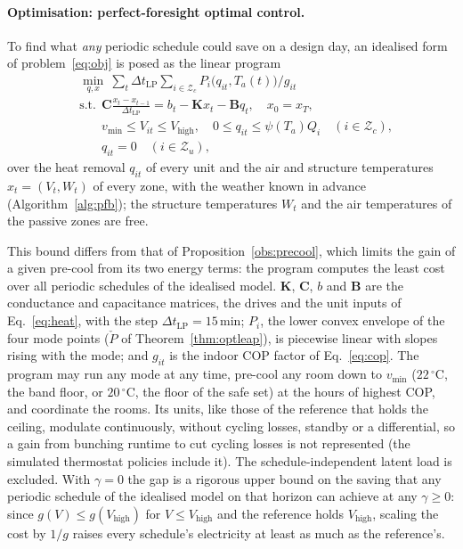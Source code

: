 \documentclass[10pt,a4paper,twocolumn]{article}
\theoremstyle{definition}
\begin{document}
\paragraph{Optimisation: perfect-foresight optimal control.}\label{sec:lpbench}\label{sec:optjust} To find what \emph{any} periodic schedule could save on a design day, an idealised form of problem~\eqref{eq:obj} is posed as the linear program
\begin{align}
&\min_{q,x}\ \sum_{t}\Delta t_{\text{LP}}\sum_{i\in\mathcal{Z}_c}P_i\bigl(q_{it},T_a(t)\bigr)/g_{it}\label{eq:lp}\\
&\text{s.t.}\ \ \mathbf{C}\frac{x_{t}-x_{t-1}}{\Delta t_{\text{LP}}}=b_{t}-\mathbf{K}x_t-\mathbf{B}q_{t},\quad x_0=x_T,\nonumber\\
&\phantom{\text{s.t.}\ \ }v_{\min}\le V_{it}\le V_{\text{high}},\quad 0\le q_{it}\le \psi(T_a)Q_i\quad (i\in\mathcal{Z}_c),\nonumber\\
&\phantom{\text{s.t.}\ \ }q_{it}=0\quad (i\in\mathcal{Z}_u),\nonumber
\end{align}
over the heat removal $q_{it}$ of every unit and the air and structure temperatures $x_t=(V_t,W_t)$ of every zone, with the weather known in advance (Algorithm~\ref{alg:pfb}); the structure temperatures $W_t$ and the air temperatures of the passive zones are free.

This bound differs from that of Proposition~\ref{obs:precool}, which limits the gain of a given pre-cool from its two energy terms: the program computes the least cost over all periodic schedules of the idealised model. $\mathbf{K}$, $\mathbf{C}$, $b$ and $\mathbf{B}$ are the conductance and capacitance matrices, the drives and the unit inputs of Eq.~\eqref{eq:heat}, with the step $\Delta t_{\text{LP}}=15\,$min; $P_i$, the lower convex envelope of the four mode points ($\check P$ of Theorem~\ref{thm:optleap}), is piecewise linear with slopes rising with the mode; and $g_{it}$ is the indoor COP factor of Eq.~\eqref{eq:cop}. The program may run any mode at any time, pre-cool any room down to $v_{\min}$ ($22\,^{\circ}$C, the band floor, or $20\,^{\circ}$C, the floor of the safe set) at the hours of highest COP, and coordinate the rooms. Its units, like those of the reference that holds the ceiling, modulate continuously, without cycling losses, standby or a differential, so a gain from bunching runtime to cut cycling losses is not represented (the simulated thermostat policies include it). The schedule-independent latent load is excluded. With $\gamma=0$ the gap is a rigorous upper bound on the saving that any periodic schedule of the idealised model on that horizon can achieve at any $\gamma\ge0$: since $g(V)\le g(V_{\text{high}})$ for $V\le V_{\text{high}}$ and the reference holds $V_{\text{high}}$, scaling the cost by $1/g$ raises every schedule's electricity at least as much as the reference's.
\end{document}
